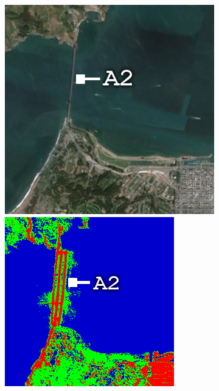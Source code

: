 \begin{figure}[tbp]
\begin{subfigure}[t]{0.19\textwidth}
\caption{}
\label{fig:cla2_a}
\end{subfigure}
\begin{subfigure}[t]{0.19\textwidth}
\includegraphics[width=\columnwidth]{Figures/ALOS2_SF_3Class/GoldenGateIm} 
\vspace{0.2cm}
\includegraphics[width=\columnwidth]{Figures/ALOS2_SF_3Class/GoldenGate}

\end{subfigure}
\end{figure}
